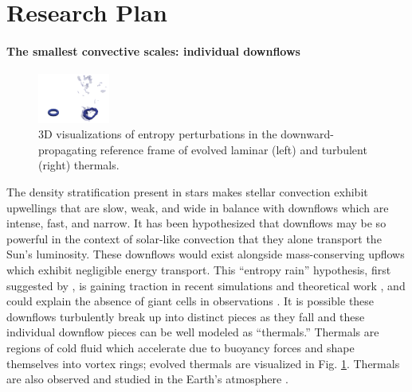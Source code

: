 \documentclass[aps, pre, onecolumn, nofootinbib, notitlepage, groupedaddress, amsfonts, amssymb, amsmath]{revtex4-1}
\begin{document}
\vspace{-10pt}
\section*{Research Plan}
\vspace{-11pt}
\paragraph*{The smallest convective scales: individual downflows}
\begin{figure}
	\begin{center}
	\vspace{-25pt}
    \includegraphics[width=0.21\textwidth]{./figs/thermals_comparison.png}
	\vspace{-20pt}
	\end{center}
    \caption{
	3D visualizations of entropy perturbations in the downward-propagating reference frame of evolved laminar (left) and turbulent (right) thermals.
	\label{fig:thermals_comparison} }
	\vspace{-11pt}
\end{figure}
The density stratification present in stars makes stellar convection exhibit upwellings that are slow, weak, and wide in balance with downflows which are intense, fast, and narrow.
It has been hypothesized that downflows may be so powerful in the context of solar-like convection that they alone transport the Sun's luminosity.
These downflows would exist alongside mass-conserving upflows which exhibit negligible energy transport.
This ``entropy rain'' hypothesis, first suggested by \citet{spruit1997}, is gaining traction in recent simulations \cite{kapyla&all2017} and theoretical work \citep{brandenburg2016}, and could explain the absence of giant cells in observations \citep{hanasoge&all2015}.
It is possible these downflows turbulently break up into distinct pieces as they fall and these individual downflow pieces can be well modeled as ``thermals.''
Thermals are regions of cold fluid which accelerate due to buoyancy forces and shape themselves into vortex rings; evolved thermals are visualized in Fig. \ref{fig:thermals_comparison}.
Thermals are also observed and studied in the Earth's atmosphere \citep{lecoanet&jeevanjee2019}.
\end{document}
